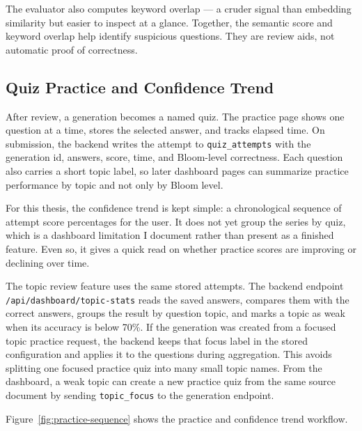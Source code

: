 \documentclass[12pt,a4paper]{article}
\begin{document}
The evaluator also computes keyword overlap — a cruder signal than
embedding similarity but easier to inspect at a glance. Together, the
semantic score and keyword overlap help identify suspicious questions.
They are review aids, not automatic proof of correctness.

\subsection{Quiz Practice and Confidence Trend}

After review, a generation becomes a named quiz. The practice page shows one
question at a time, stores the selected answer, and tracks elapsed time. On
submission, the backend writes the attempt to \texttt{quiz\_attempts} with
the generation id, answers, score, time, and Bloom-level correctness. Each
question also carries a short topic label, so later dashboard pages can
summarize practice performance by topic and not only by Bloom level.

For this thesis, the confidence trend is kept simple: a chronological
sequence of attempt score percentages for the user. It does not yet group
the series by quiz, which is a dashboard limitation I document rather than
present as a finished feature. Even so, it gives a quick read on whether
practice scores are improving or declining over time.

The topic review feature uses the same stored attempts. The backend endpoint
\texttt{/api/dashboard/topic-stats} reads the saved answers, compares them
with the correct answers, groups the result by question topic, and marks a
topic as weak when its accuracy is below 70\%. If the generation was created
from a focused topic practice request, the backend keeps that focus label in
the stored configuration and applies it to the questions during aggregation.
This avoids splitting one focused practice quiz into many small topic names.
From the dashboard, a weak topic can create a new practice quiz from the
same source document by sending \texttt{topic\_focus} to the generation
endpoint.

Figure~\ref{fig:practice-sequence} shows the practice and confidence trend
workflow.
\end{document}
